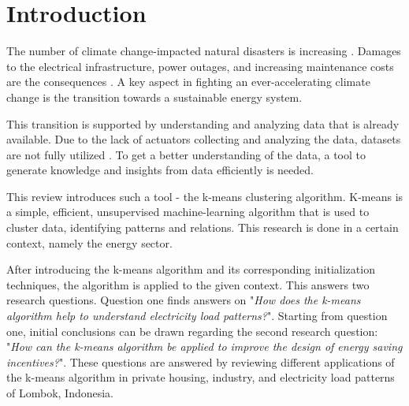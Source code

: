 \section{Introduction}
\label{cha:introduction}


The number of climate change-impacted natural disasters is increasing \cite{JES-IND}.
Damages to the electrical infrastructure, power outages, and increasing maintenance costs are the consequences \cite{FAN-CCI}.
A key aspect in fighting an ever-accelerating climate change is the transition towards a sustainable energy system.

This transition is supported by understanding and analyzing data that is already available.
Due to the lack of actuators collecting and analyzing the data, datasets are not fully utilized \cite{LIU-BDE}.
To get a better understanding of the data, a tool to generate knowledge and insights from data efficiently is needed.

This review introduces such a tool - the k-means clustering algorithm.
K-means is a simple, efficient, unsupervised machine-learning algorithm that is used to cluster data, identifying patterns and relations.
This research is done in a certain context, namely the energy sector.

After introducing the k-means algorithm and its corresponding initialization techniques, the algorithm is applied to the given context.
This answers two research questions.
Question one finds answers on "\textit{How does the k-means algorithm help to understand electricity load patterns?}".
Starting from question one, initial conclusions can be drawn regarding the second research question: "\textit{How can the k-means algorithm be applied to improve the design of energy saving incentives?}".
These questions are answered by reviewing different applications of the k-means algorithm in private housing, industry, and electricity load patterns of Lombok, Indonesia.

